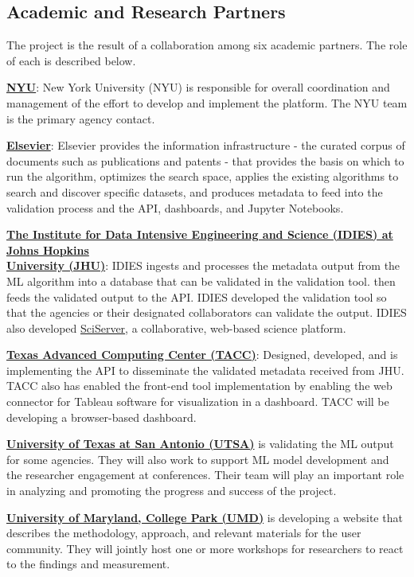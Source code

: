 \documentclass[titlepage, 11pt]{article}
\begin{document}
{\subsection{Academic and Research Partners}
The project is the result of a collaboration among six academic partners.   The role of each is described below.

\underline{\textbf{NYU}}: New York University (NYU) is responsible for overall coordination and management of the effort to develop and implement the platform. The NYU team is the primary agency contact.

\underline{\textbf{Elsevier}}: Elsevier provides the information infrastructure - the curated corpus of documents such as publications and patents - that provides the basis on which to run the algorithm, optimizes the search space, applies the existing algorithms to search and discover specific datasets, and produces metadata to feed into the validation process and the API, dashboards, and Jupyter Notebooks.

\underline{\textbf{The Institute for Data Intensive Engineering and Science (IDIES) at Johns Hopkins}} \\ \underline{\textbf{University (JHU)}}: IDIES ingests and processes the metadata output from the ML algorithm into a database that can be validated in the validation tool. then feeds the validated output to the API. IDIES developed the validation tool so that the agencies or their designated collaborators can validate the output. IDIES also developed \href{http://www.sciserver.org/}{SciServer}, a collaborative, web-based science platform. 

\underline{\textbf{Texas Advanced Computing Center (TACC)}}: Designed, developed, and is implementing the API to disseminate the validated metadata received from JHU. TACC also has enabled the front-end tool implementation by enabling the web connector for Tableau software for visualization in a dashboard. TACC will be developing a browser-based dashboard.

\underline{\textbf{University of Texas at San Antonio (UTSA)}} is validating the ML output for some agencies.  They will also work to support ML model development and the researcher engagement at conferences. Their team will play an important role in analyzing and promoting the progress and success of the project.

\underline{\textbf{University of Maryland, College Park (UMD)}} is developing a website that describes the methodology, approach, and relevant materials for the user community.  They will jointly host one or more workshops for researchers to react to the findings and measurement.

}
\end{document}
